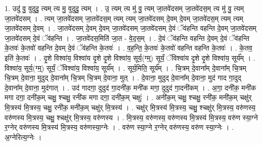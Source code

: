 \documentclass[17pt]{extarticle}
\begin{document}
1. उदु॑ वु॒ वुदुदु॒ त्यम् त्य मु॒ वुदुदु॒ त्यम् । . उ॒ त्यम् त्य मु॑ वु॒ त्यम् जा॒तवे॑दसम् जा॒तवे॑दस॒म् त्य मु॑ वु॒ त्यम् जा॒तवे॑दसम् । . त्यम् जा॒तवे॑दसम् जा॒तवे॑दस॒म् त्यम् त्यम् जा॒तवे॑दसम् दे॒वम् दे॒वम् जा॒तवे॑दस॒म् त्यम् त्यम् जा॒तवे॑दसम् दे॒वम् । . जा॒तवे॑दसम् दे॒वम् दे॒वम् जा॒तवे॑दसम् जा॒तवे॑दसम् दे॒वं ॅव॑हन्ति वहन्ति दे॒वम् जा॒तवे॑दसम् जा॒तवे॑दसम् दे॒वं ॅव॑हन्ति । . जा॒तवे॑दस॒मिति॑ जा॒त - वे॒द॒स॒म् । . दे॒वं ॅव॑हन्ति वहन्ति दे॒वम् दे॒वं ॅव॑हन्ति के॒तवः॑ के॒तवो॑ वहन्ति दे॒वम् दे॒वं ॅव॑हन्ति के॒तवः॑ । . व॒ह॒न्ति॒ के॒तवः॑ के॒तवो॑ वहन्ति वहन्ति के॒तवः॑ । . के॒तव॒ इति॑ के॒तवः॑ । . दृ॒शे विश्वा॑य॒ विश्वा॑य दृ॒शे दृ॒शे विश्वा॑य॒ सूर्य॒(ग्म्॒) सूर्यं॒ ॅविश्वा॑य दृ॒शे दृ॒शे विश्वा॑य॒ सूर्य᳚म् । . विश्वा॑य॒ सूर्य॒(ग्म्॒) सूर्यं॒ ॅविश्वा॑य॒ विश्वा॑य॒ सूर्य᳚म् । . सूर्य॒मिति॒ सूर्य᳚म् । . चि॒त्रम् दे॒वाना᳚म् दे॒वाना᳚म् चि॒त्रम् चि॒त्रम् दे॒वाना॒ मुदुद् दे॒वाना᳚म् चि॒त्रम् चि॒त्रम् दे॒वाना॒ मुत् । . दे॒वाना॒ मुदुद् दे॒वाना᳚म् दे॒वाना॒ मुद॑ गाद गा॒दुद् दे॒वाना᳚म् दे॒वाना॒ मुद॑गात् । . उद॑ गादगा॒ दुदुद॑ गा॒दनी॑क॒ मनी॑क मगा॒ दुदुद॑ गा॒दनी॑कम् । . अ॒गा॒ दनी॑क॒ मनी॑क मगा दगा॒ दनी॑क॒म् चक्षु॒ श्चक्षु॒ रनी॑क मगा दगा॒ दनी॑क॒म् चक्षुः॑ । . अनी॑क॒म् चक्षु॒ श्चक्षु॒ रनी॑क॒ मनी॑क॒म् चक्षु॑र् मि॒त्रस्य॑ मि॒त्रस्य॒ चक्षु॒ रनी॑क॒ मनी॑क॒म् चक्षु॑र् मि॒त्रस्य॑ । . चक्षु॑र् मि॒त्रस्य॑ मि॒त्रस्य॒ चक्षु॒ श्चक्षु॑र् मि॒त्रस्य॒ वरु॑णस्य॒ वरु॑णस्य मि॒त्रस्य॒ चक्षु॒ श्चक्षु॑र् मि॒त्रस्य॒ वरु॑णस्य । . मि॒त्रस्य॒ वरु॑णस्य॒ वरु॑णस्य मि॒त्रस्य॑ मि॒त्रस्य॒ वरु॑ण स्या॒ग्ने र॒ग्नेर् वरु॑णस्य मि॒त्रस्य॑ मि॒त्रस्य॒ वरु॑णस्या॒ग्नेः । . वरु॑ण स्या॒ग्ने र॒ग्नेर् वरु॑णस्य॒ वरु॑ण स्या॒ग्नेः । . अ॒ग्नेरित्य॒ग्नेः । \newline
\end{document}
